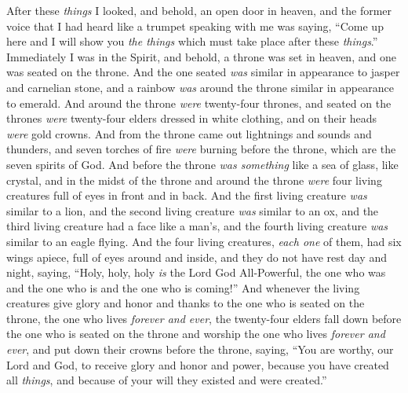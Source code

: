 \begin{biblechapter} %
 After these \textit{things} I looked, and behold, an open door in heaven, and the former voice that I had heard like a trumpet speaking with me was saying, “Come up here and I will show you \textit{the things} which must take place after these \textit{things}.”
\verse Immediately I was in the Spirit, and behold, a throne was set in heaven, and one was seated on the throne.
\verse And the one seated \textit{was} similar in appearance to jasper and carnelian stone, and a rainbow \textit{was} around the throne similar in appearance to emerald.
\verse And around the throne \textit{were} twenty-four thrones, and seated on the thrones \textit{were} twenty-four elders dressed in white clothing, and on their heads \textit{were} gold crowns.
\verse And from the throne came out lightnings and sounds and thunders, and seven torches of fire \textit{were} burning before the throne, which are the seven spirits of God.
\verse And before the throne \textit{was something} like a sea of glass, like crystal, and in the midst of the throne and around the throne \textit{were} four living creatures full of eyes in front and in back.
\verse And the first living creature \textit{was} similar to a lion, and the second living creature \textit{was} similar to an ox, and the third living creature had a face like a man’s, and the fourth living creature \textit{was} similar to an eagle flying.
\verse And the four living creatures, \textit{each one} of them, had six wings apiece, full of eyes around and inside, and they do not have rest day and night, saying, “Holy, holy, holy \textit{is} the Lord God All-Powerful, 
the one who was and the one who is and the one who is coming!”
\verse And whenever the living creatures give glory and honor and thanks to the one who is seated on the throne, the one who lives \textit{forever and ever},
\verse the twenty-four elders fall down before the one who is seated on the throne and worship the one who lives \textit{forever and ever}, and put down their crowns before the throne, saying,
\verse “You are worthy, our Lord and God, 
to receive glory and honor and power, 
because you have created all \textit{things}, 
and because of your will they existed and were created.”
\end{biblechapter}

